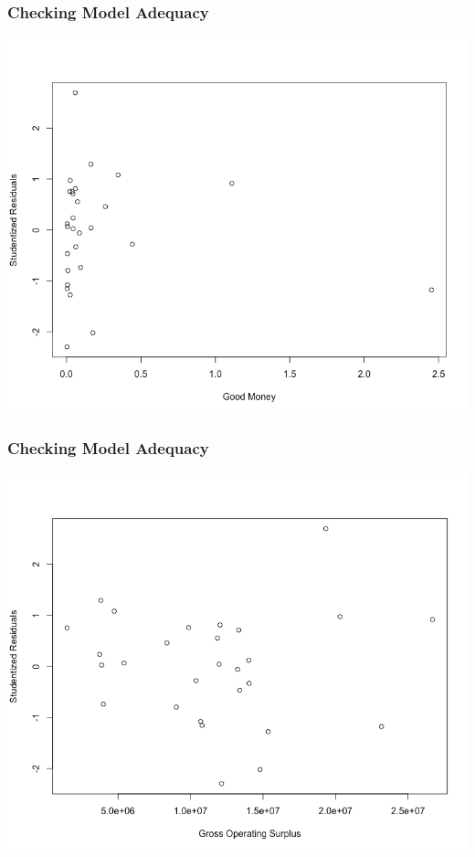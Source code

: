 \documentclass[12pt]{beamer}
\begin{document}
\begin{frame}
\begin{center}
\frametitle{Checking Model Adequacy}
\includegraphics[scale=0.3]{pic4.png}
\end{center}
\end{frame}
\begin{frame}
\begin{center}
\frametitle{Checking Model Adequacy}
\includegraphics[scale=0.3]{pic5.png}
\end{center}
\end{frame}
\end{document}
